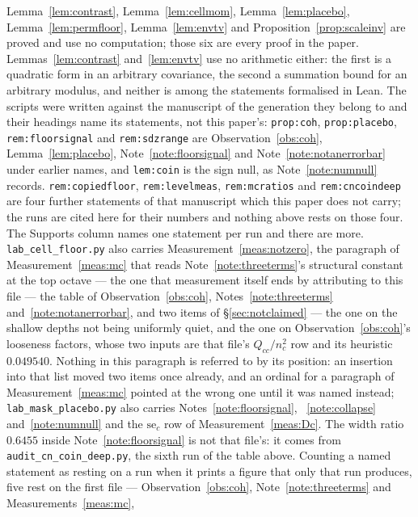 \documentclass[11pt,a4paper]{article}
\theoremstyle{plain}
\theoremstyle{definition}
\theoremstyle{remark}
\begin{document}
Lemma~\ref{lem:contrast}, Lemma~\ref{lem:cellmom},
Lemma~\ref{lem:placebo}, Lemma~\ref{lem:permfloor},
Lemma~\ref{lem:envtv} and Proposition~\ref{prop:scaleinv} are proved
and use no computation; those six are every proof in the paper.
Lemmas~\ref{lem:contrast} and~\ref{lem:envtv} use no arithmetic
either: the first is a quadratic form in an arbitrary covariance, the
second a summation bound for an arbitrary modulus, and neither is
among the statements formalised in Lean.
The scripts were written against the manuscript of the generation they
belong to and their headings name its statements, not this paper's:
\texttt{prop:coh}, \texttt{prop:placebo}, \texttt{rem:floorsignal} and
\texttt{rem:sdzrange} are Observation~\ref{obs:coh},
Lemma~\ref{lem:placebo}, Note~\ref{note:floorsignal} and
Note~\ref{note:notanerrorbar} under earlier names, and
\texttt{lem:coin} is the sign null, as Note~\ref{note:numnull}
records. \texttt{rem:copiedfloor}, \texttt{rem:levelmeas},
\texttt{rem:mcratios} and \texttt{rem:cncoindeep} are four further
statements of that manuscript which this paper does not carry; the
runs are cited here for their numbers and nothing above rests on
those four.
The Supports column names one statement per run and there are more.
\texttt{lab\_cell\_floor.py} also carries
Measurement~\ref{meas:notzero}, the paragraph of
Measurement~\ref{meas:mc} that reads
Note~\ref{note:threeterms}'s structural constant at the top octave
--- the one that measurement itself ends by attributing to this file
--- the table of
Observation~\ref{obs:coh}, Notes~\ref{note:threeterms}
and~\ref{note:notanerrorbar}, and two items of
\S\ref{sec:notclaimed} --- the one on the shallow depths not being
uniformly quiet, and the one on Observation~\ref{obs:coh}'s looseness
factors, whose two inputs are that file's $Q_{cc}/n_c^2$ row and its
heuristic $0.049540$. Nothing in this paragraph is referred to by its
position: an insertion into that list moved two items once already,
and an ordinal for a paragraph of Measurement~\ref{meas:mc} pointed at
the wrong one until it was named instead;
\texttt{lab\_mask\_placebo.py} also carries
Notes~\ref{note:floorsignal}, ~\ref{note:collapse}
and~\ref{note:numnull} and the \(\mathrm{se}_c\) row of
Measurement~\ref{meas:Dc}. The width ratio $0.6455$ inside
Note~\ref{note:floorsignal} is not that file's: it comes from
\texttt{audit\_cn\_coin\_deep.py},
the sixth run of the table above. Counting a named statement as
resting on a run when it prints a figure that only that run produces,
five rest on the first file --- Observation~\ref{obs:coh},
Note~\ref{note:threeterms} and Measurements~\ref{meas:mc},
\end{document}
